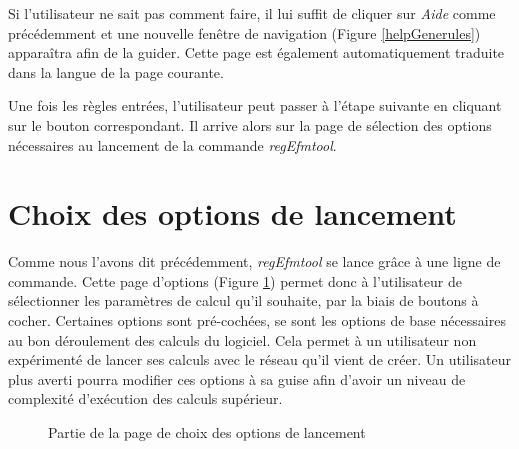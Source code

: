Si l'utilisateur ne sait pas comment faire, il lui suffit de cliquer sur \textit{Aide} comme précédemment et une nouvelle fen\^etre de navigation (Figure \ref{helpGenerules}) appara\^itra afin de la guider. Cette page est également automatiquement traduite dans la langue de la page courante. 

Une fois les règles entrées, l'utilisateur peut passer à l'étape suivante en cliquant sur le bouton correspondant. Il arrive alors sur la page de sélection des options nécessaires au lancement de la commande \textit{regEfmtool}.

\section{Choix des options de lancement}

Comme nous l'avons dit précédemment, \textit{regEfmtool} se lance gr\^ace à une ligne de commande. Cette page d'options (Figure \ref{options}) permet donc à l'utilisateur de sélectionner les paramètres de calcul qu'il souhaite, par la biais de boutons à cocher. Certaines options sont pré-cochées, se sont les options de base nécessaires au bon déroulement des calculs du logiciel. Cela permet à un utilisateur non expérimenté de lancer ses calculs avec le réseau qu'il vient de créer. Un utilisateur plus averti pourra modifier ces options à sa guise afin d'avoir un niveau de complexité d'exécution des calculs supérieur.\\

\begin{figure}[!ht]
	\begin{center}
		\caption{Partie de la page de choix des options de lancement}
  		\label{options}
  	\end{center}	
\end{figure}

